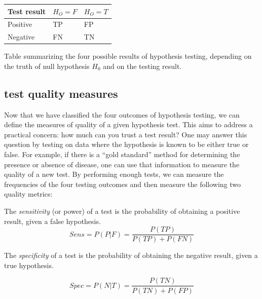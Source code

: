 \documentclass[
  letterpaper,
  DIV=11,
  numbers=noendperiod]{scrreprt}
\begin{document}
\begin{longtable}[]{@{}lll@{}}
\toprule()
Test result & \(H_O = F\) & \(H_O=T\) \\
\midrule()
\endhead
Positive & TP & FP \\
Negative & FN & TN \\
\bottomrule()
\end{longtable}

Table summarizing the four possible results of hypothesis testing,
depending on the truth of null hypothesis \(H_0\) and on the testing
result.

\hypertarget{test-quality-measures}{%
\subsection{test quality measures}\label{test-quality-measures}}

Now that we have classified the four outcomes of hypothesis testing, we
can define the measures of quality of a given hypothesis test. This aims
to address a practical concern: how much can you trust a test result?
One may answer this question by testing on data where the hypothesis is
known to be either true or false. For example, if there is a ``gold
standard'' method for determining the presence or absence of disease,
one can use that information to measure the quality of a new test. By
performing enough tests, we can measure the frequencies of the four
testing outcomes and then measure the following two quality metrics:

\begin{tcolorbox}[enhanced jigsaw, coltitle=black, arc=.35mm, opacitybacktitle=0.6, breakable, bottomtitle=1mm, toptitle=1mm, titlerule=0mm, colback=white, leftrule=.75mm, rightrule=.15mm, colframe=quarto-callout-note-color-frame, colbacktitle=quarto-callout-note-color!10!white, opacityback=0, title=\textcolor{quarto-callout-note-color}{\faInfo}\hspace{0.5em}{Definition}, left=2mm, toprule=.15mm, bottomrule=.15mm]

The \emph{sensitivity} (or power) of a test is the probability of
obtaining a positive result, given a false hypothesis.
\[ Sens = P(P | F) = \frac{P(TP)}{P(TP) + P(FN)} \]

The \emph{specificity} of a test is the probability of obtaining the
negative result, given a true hypothesis.

\[ Spec = P(N | T) = \frac{P(TN)}{P(TN) + P(FP)} \]

\end{tcolorbox}
\end{document}

